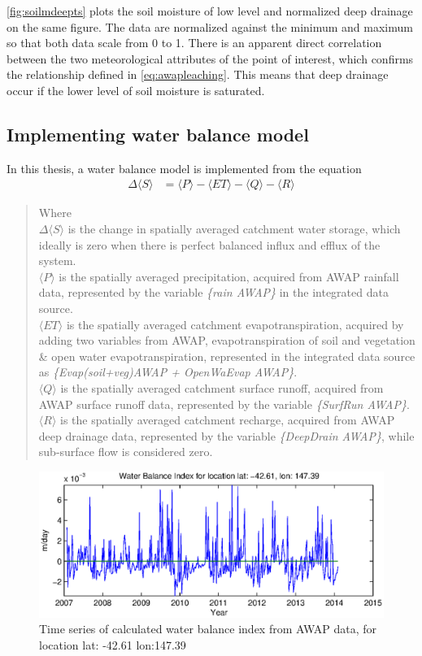 \autoref{fig:soilmdeepts} plots the soil moisture of low level and normalized deep drainage on the same figure. The data are normalized against the minimum and maximum so that both data scale from 0 to 1. There is an apparent direct correlation between the two meteorological attributes of the point of interest, which confirms the relationship defined in \autoref{eq:awapleaching}. This means that deep drainage occur if the lower level of soil moisture is saturated.
\subsection{Implementing water balance model}\label{subsection:implementwaterbalance}
In this thesis, a water balance model is implemented from the equation 
\begin{align}
	\Delta \langle S\rangle &= \langle P\rangle - \langle ET\rangle-\langle Q\rangle-\langle R\rangle
	\label{eq:wbsimple}
\end{align}
\begin{quote}Where \\
\indent$\Delta \langle S\rangle$ is the change in spatially averaged catchment water storage, which ideally is zero when there is perfect balanced influx and efflux of the system.\\
\indent$\langle P\rangle$ is the spatially averaged precipitation, acquired from AWAP rainfall data, represented by the variable \emph{\{rain AWAP\}} in the integrated data source.\\
\indent$\langle ET\rangle$ is the spatially averaged catchment evapotranspiration, acquired by adding two variables from AWAP, evapotranspiration of soil and vegetation \& open water evapotranspiration, represented in the integrated data source as \emph{\{Evap(soil+veg)AWAP + OpenWaEvap AWAP\}}.\\
\indent$\langle Q\rangle$ is the spatially averaged catchment surface runoff, acquired from AWAP surface runoff data, represented by the variable \emph{\{SurfRun AWAP\}}.\\
\indent$\langle R\rangle$ is the spatially averaged catchment recharge, acquired from AWAP deep drainage data, represented by the variable \emph{\{DeepDrain AWAP\}}, while sub-surface flow is considered zero.
\end{quote}
\begin{figure}[hbt]
\begin{center}
\includegraphics[width=\linewidth]{gfx/waterts.eps}
\end{center}
\caption{Time series of calculated water balance index from AWAP data, for location lat: -42.61 lon:147.39}
\label{fig:waterts}
\end{figure}
